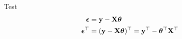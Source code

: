 \documentclass{beamer}
\begin{document}
\begin{frame}{Test}
\begin{align*}
\boldsymbol{\epsilon} &= \mathbf{y} - \mathbf{X}\boldsymbol{\theta} \\ 
\boldsymbol{\epsilon}^\top &= (\mathbf{y}-\mathbf{X}\boldsymbol{\theta})^\top = \mathbf{y}^\top - \boldsymbol{\theta}^\top\mathbf{X}^\top
\end{align*}
\end{frame}
\end{document}
